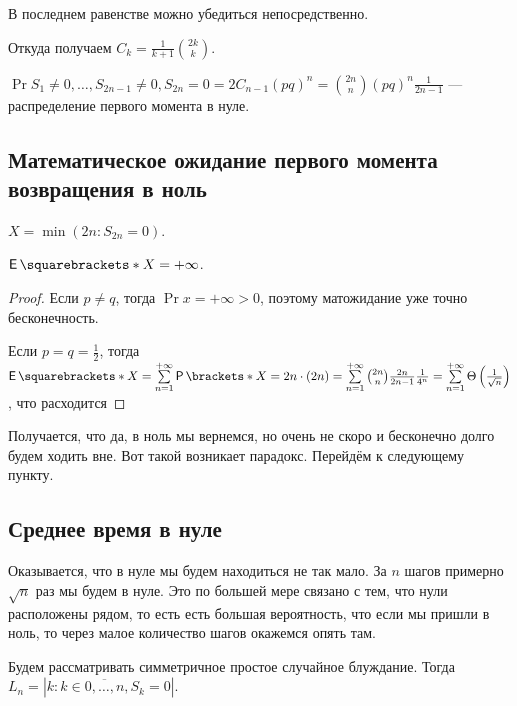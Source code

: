 В последнем равенстве можно убедиться непосредственно.

Откуда получаем $C_k = \frac{1}{k + 1}\binom{2k}{k}$.

\begin{remark}
  $\Pr{S_1 \neq 0, \ldots, S_{2n - 1} \neq 0, S_{2n} = 0} = 2C_{n - 1}(pq)^n =
  \binom{2n}{n}(pq)^n\frac{1}{2n - 1}$ --- распределение первого момента в нуле.
\end{remark}

\subsection{Математическое ожидание первого момента возвращения в ноль}

\begin{definition}
  $X = \min(2n : S_{2n} = 0)$.
\end{definition}

\begin{theorem}
  $\E{X} = +\infty$.
\end{theorem}

\begin{proof}
  Если $p \neq q$, тогда $\Pr{x = +\infty} > 0$, поэтому матожидание уже
  точно бесконечность.

  Если $p = q = \frac{1}{2}$, тогда $\E{X} = \sum\limits_{n = 1}^{+\infty}
  \Pr{X = 2n}\cdot (2n) = \sum\limits_{n = 1}^{+\infty} \binom{2n}{n} 
  \frac{2n}{2n - 1}\frac{1}{4^n} = \sum\limits_{n = 1}^{+\infty}\Theta\left(\frac{1}{\sqrt{n}}\right)$, что расходится
\end{proof}

Получается, что да, в ноль мы вернемся, но очень не скоро и бесконечно долго будем
ходить вне. Вот такой возникает парадокс. Перейдём к следующему пункту.

\subsection{Среднее время в нуле}

Оказывается, что в нуле мы будем находиться не так мало. За $n$ шагов примерно
$\sqrt{n}$ раз мы будем в нуле. Это по большей мере связано с тем, что нули
расположены рядом, то есть есть большая вероятность, что если мы пришли в ноль,
то через малое количество шагов окажемся опять там.

\begin{definition}
  Будем рассматривать симметричное простое случайное блуждание. Тогда 
  $L_n = \left|k : k \in \overline{0, \ldots, n}, S_k = 0\right|$.
\end{definition}

